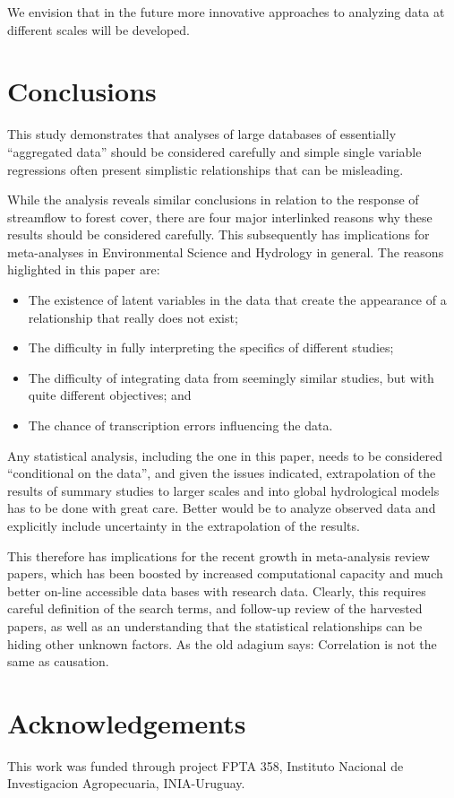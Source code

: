 \documentclass[]{elsarticle} %
\providecommand{\tightlist}{%
  \setlength{\itemsep}{0pt}\setlength{\parskip}{0pt}}
\begin{document}
We envision that in the future more innovative approaches to analyzing data at different scales will be developed.

\hypertarget{conclusions}{%
\section{Conclusions}\label{conclusions}}

This study demonstrates that analyses of large databases of essentially ``aggregated data'' should be considered carefully and simple single variable regressions often present simplistic relationships that can be misleading.

While the analysis reveals similar conclusions in relation to the response of streamflow to forest cover, there are four major interlinked reasons why these results should be considered carefully. This subsequently has implications for meta-analyses in Environmental Science and Hydrology in general. The reasons higlighted in this paper are:

\begin{itemize}
\tightlist
\item
  The existence of latent variables in the data that create the appearance of a relationship that really does not exist;\\
\item
  The difficulty in fully interpreting the specifics of different studies;\\
\item
  The difficulty of integrating data from seemingly similar studies, but with quite different objectives; and\\
\item
  The chance of transcription errors influencing the data.
\end{itemize}

Any statistical analysis, including the one in this paper, needs to be considered ``conditional on the data'', and given the issues indicated, extrapolation of the results of summary studies to larger scales and into global hydrological models has to be done with great care. Better would be to analyze observed data and explicitly include uncertainty in the extrapolation of the results.

This therefore has implications for the recent growth in meta-analysis review papers, which has been boosted by increased computational capacity and much better on-line accessible data bases with research data. Clearly, this requires careful definition of the search terms, and follow-up review of the harvested papers, as well as an understanding that the statistical relationships can be hiding other unknown factors. As the old adagium says: Correlation is not the same as causation.

\hypertarget{acknowledgements}{%
\section{Acknowledgements}\label{acknowledgements}}

This work was funded through project FPTA 358, Instituto Nacional de Investigacion Agropecuaria, INIA-Uruguay.

\renewcommand\refname{References}

\end{document}
